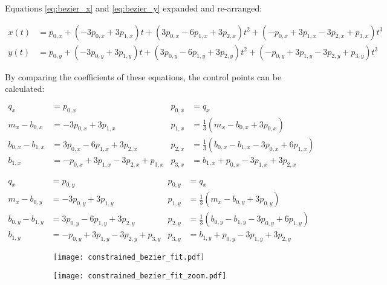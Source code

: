 Equations \ref{eq:bezier_x} and \ref{eq:bezier_y} expanded and re-arranged:

\begin{align}
    x(t) &= p_{0,x} + (-3p_{0,x} + 3p_{1,x})t + (3p_{0,x} - 6p_{1,x} + 3p_{2,x})t^2 + (-p_{0,x} + 3p_{1,x} - 3p_{2,x} + p_{3,x})t^3 \\
    y(t) &= p_{0,y} + (-3p_{0,y} + 3p_{1,y})t + (3p_{0,y} - 6p_{1,y} + 3p_{2,y})t^2 + (-p_{0,y} + 3p_{1,y} - 3p_{2,y} + p_{3,y})t^3
\end{align}

By comparing the coefficients of these equations, the control points can be calculated:

\begin{align}
    q_x               &= p_{0,x}              &
    p_{0,x} &= q_x \\
    m_x - b_{0,x}     &= -3p_{0,x} + 3p_{1,x} &
    p_{1,x} &= \frac{1}{3} (m_x - b_{0,x} + 3p_{0,x}) \\
    b_{0,x} - b_{1,x} &= 3p_{0,x} - 6p_{1,x} + 3p_{2,x} &
    p_{2,x} &= \frac{1}{3} (b_{0,x} - b_{1,x} - 3p_{0,x} + 6p_{1,x}) \\
    b_{1,x}           &= -p_{0,x} + 3p_{1,x} - 3p_{2,x} + p_{3,x} &
    p_{3,x} &= b_{1,x} + p_{0,x} - 3p_{1,x} + 3p_{2,x}
\end{align}

\begin{align}
    q_x               &= p_{0,y}              &
    p_{0,y} &= q_x \\
    m_x - b_{0,y}     &= -3p_{0,y} + 3p_{1,y} &
    p_{1,y} &= \frac{1}{3} (m_x - b_{0,y} + 3p_{0,y}) \\
    b_{0,y} - b_{1,y} &= 3p_{0,y} - 6p_{1,y} + 3p_{2,y} &
    p_{2,y} &= \frac{1}{3} (b_{0,y} - b_{1,y} - 3p_{0,y} + 6p_{1,y}) \\
    b_{1,y}           &= -p_{0,y} + 3p_{1,y} - 3p_{2,y} + p_{3,y} &
    p_{3,y} &= b_{1,y} + p_{0,y} - 3p_{1,y} + 3p_{2,y}
\end{align}

\begin{figure}
    \centering
    \begin{subfigure}{.45\linewidth}
        \centering
        \texttt{[image: constrained\_bezier\_fit.pdf]}
        \caption{}
    \end{subfigure}
        \begin{subfigure}{.45\linewidth}
        \centering
        \texttt{[image: constrained\_bezier\_fit\_zoom.pdf]}
        \caption{}
    \end{subfigure}
    \caption{}
    \label{fig:constrained_bezier_fit}
\end{figure}
